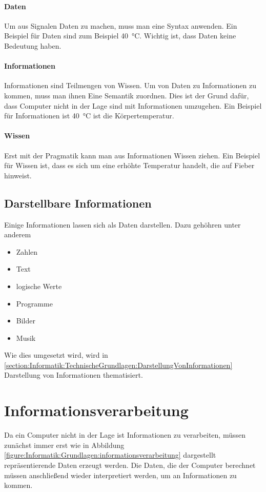 \documentclass[../main.tex]{subfiles}
\begin{document}
        \paragraph{Daten}
            Um aus Signalen Daten zu machen, muss man eine Syntax anwenden. Ein Beispiel für Daten sind zum Beispiel \SI{40}{\celsius}. Wichtig ist, dass Daten keine Bedeutung haben.
        
        \paragraph{Informationen}
            Informationen sind Teilmengen von Wissen.
            Um von Daten zu Informationen zu kommen, muss man ihnen Eine Semantik zuordnen. Dies ist der Grund dafür, dass Computer nicht in der Lage sind mit Informationen umzugehen. Ein Beispiel für Informationen ist \SI{40}{\celsius} ist die Körpertemperatur.
        
        \paragraph{Wissen}
            Erst mit der Pragmatik kann man aus Informationen Wissen ziehen. Ein Beispiel für Wissen ist, dass es sich um eine erhöhte Temperatur handelt, die auf Fieber hinweist.
        
        \subsection{Darstellbare Informationen}
            Einige Informationen lassen sich als Daten darstellen. Dazu gehöhren unter anderem
        
            \begin{itemize}
                \item Zahlen
                \item Text
                \item logische Werte
                \item Programme
                \item Bilder
                \item Musik
            \end{itemize}
            
            Wie dies umgesetzt wird, wird in \ref{section:Informatik:TechnischeGrundlagen:DarstellungVonInformationen} Darstellung von Informationen thematisiert.
            
    \section{Informationsverarbeitung}
        Da ein Computer nicht in der Lage ist Informationen zu verarbeiten, müssen zunächst immer erst wie in Abbildung \ref{figure:Informatik:Grundlagen:informationsverarbeitung} dargestellt repräsentierende Daten erzeugt werden. Die Daten, die der Computer berechnet müssen anschließend wieder interpretiert werden, um an Informationen zu kommen.
        
\end{document}

